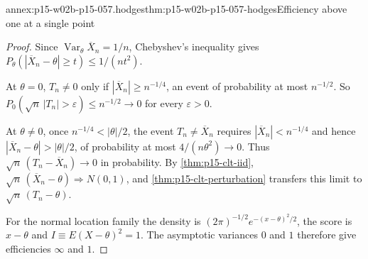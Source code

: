 \begin{annexitem}{annex:p15-w02b-p15-057.hodges}{thm:p15-w02b-p15-057-hodges}{Efficiency above one at a single point}
\begin{proof}
Since \(\operatorname{Var}_\theta\overline X_n=1/n\), Chebyshev's inequality
gives \(P_\theta(|\overline X_n-\theta|\geq t)\leq1/(nt^2)\).

At \(\theta=0\), \(T_n\neq0\) only if \(|\overline X_n|\geq n^{-1/4}\), an
event of probability at most \(n^{-1/2}\). So
\(P_0(\sqrt n\,|T_n|>\varepsilon)\leq n^{-1/2}\to0\) for every
\(\varepsilon>0\).

At \(\theta\neq0\), once \(n^{-1/4}<|\theta|/2\), the event
\(T_n\neq\overline X_n\) requires \(|\overline X_n|<n^{-1/4}\) and hence
\(|\overline X_n-\theta|>|\theta|/2\), of probability at most
\(4/(n\theta^2)\to0\). Thus \(\sqrt n\,(T_n-\overline X_n)\to0\) in
probability. By \cref{thm:p15-clt-iid},
\(\sqrt n\,(\overline X_n-\theta)\Rightarrow N(0,1)\), and
\cref{thm:p15-clt-perturbation} transfers this limit to
\(\sqrt n\,(T_n-\theta)\).

For the normal location family the density is
\((2\pi)^{-1/2}e^{-(x-\theta)^2/2}\), the score is \(x-\theta\) and
\(I\equiv E(X-\theta)^2=1\). The asymptotic variances \(0\) and \(1\)
therefore give efficiencies \(\infty\) and \(1\).
\end{proof}
\end{annexitem}


